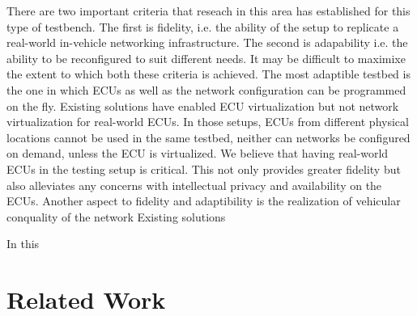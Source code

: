 \documentclass[letterpaper,twocolumn,12pt]{article}
\begin{document}
There are two important criteria that reseach in this area has established for this type of testbench. The first is fidelity, i.e. the ability of the setup to replicate a real-world in-vehicle networking infrastructure. The second is adapability i.e. the ability to be reconfigured to suit different needs. It may be difficult to maximixe the extent to which both these criteria is achieved. The most adaptible testbed is the one in which ECUs as well as the network  configuration can be programmed on the fly. Existing solutions have enabled ECU virtualization but not network virtualization for real-world ECUs. In those setups, ECUs from different physical locations cannot be used in the same testbed, neither can networks be configured on demand, unless the ECU is virtualized.
We believe that having real-world ECUs in the testing setup is critical. This not only provides greater fidelity but also alleviates any concerns with intellectual privacy and availability on the ECUs. Another aspect to fidelity and adaptibility is the realization of vehicular conquality of the network 
Existing solutions 

In this 

\section{Related Work}

\end{document}
